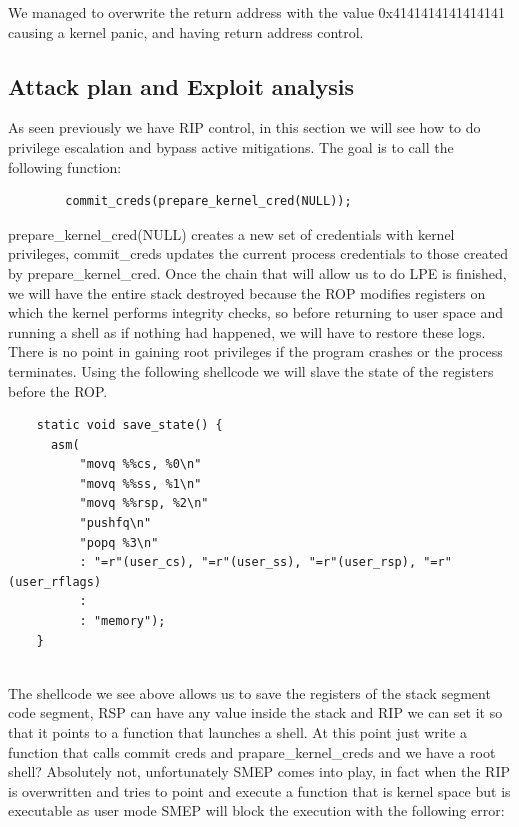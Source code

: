     
    We managed to overwrite the return address with the value 0x4141414141414141 causing a kernel panic, and having return address control.\newline
    \subsection{Attack plan and Exploit analysis}
    As seen previously we have RIP control, in this section we will see how to do privilege escalation and bypass active mitigations.\newline
    The goal is to call the following function:\newline
    \begin{verbatim}
        commit_creds(prepare_kernel_cred(NULL));
    \end{verbatim}
prepare\_kernel\_cred(NULL) creates a new set of credentials with kernel privileges, commit\_creds updates the current process credentials to those created by prepare\_kernel\_cred.\newline
    Once the chain that will allow us to do LPE is finished, we will have the entire stack destroyed because the ROP modifies registers on which the kernel performs integrity checks, so before returning to user space and running a shell as if nothing had happened, we will have to restore these logs.\newline
    There is no point in gaining root privileges if the program crashes or the process terminates.\newline
   Using the following shellcode we will slave the state of the registers before the ROP.\newline
    \begin{verbatim}
    static void save_state() {
      asm(
          "movq %%cs, %0\n"
          "movq %%ss, %1\n"
          "movq %%rsp, %2\n"
          "pushfq\n"
          "popq %3\n"
          : "=r"(user_cs), "=r"(user_ss), "=r"(user_rsp), "=r"(user_rflags)
          :
          : "memory");
    }
    
    \end{verbatim}
    The shellcode we see above allows us to save the registers of the stack segment code segment, RSP can have any value inside the stack and RIP we can set it so that it points to a function that launches a shell.\newline
    At this point just write a function that calls commit creds and prapare\_kernel\_creds and we have a root shell?\newline
    Absolutely not, unfortunately SMEP comes into play, in fact when the RIP is overwritten and tries to point and execute a function that is kernel space but is executable as user mode SMEP will block the execution with the following error:
